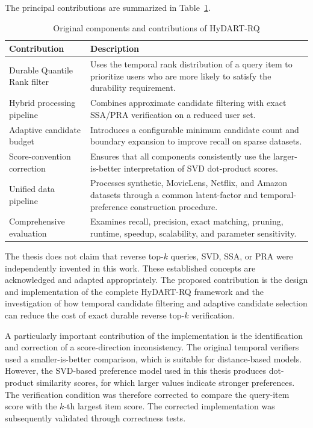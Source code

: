 The principal contributions are summarized in Table~\ref{tab:original_contributions}.

\begin{table}[htbp]
\centering
\caption{Original components and contributions of HyDART-RQ}
\label{tab:original_contributions}
\small
\renewcommand{\arraystretch}{1.25}
\setlength{\tabcolsep}{4pt}
\begin{tabularx}{\textwidth}{|p{3.5cm}|X|}
\hline
\textbf{Contribution} &
\textbf{Description} \\
\hline
Durable Quantile Rank filter &
Uses the temporal rank distribution of a query item to prioritize users who are more likely to satisfy the durability requirement. \\
\hline
Hybrid processing pipeline &
Combines approximate candidate filtering with exact SSA/PRA verification on a reduced user set. \\
\hline
Adaptive candidate budget &
Introduces a configurable minimum candidate count and boundary expansion to improve recall on sparse datasets. \\
\hline
Score-convention correction &
Ensures that all components consistently use the larger-is-better interpretation of SVD dot-product scores. \\
\hline
Unified data pipeline &
Processes synthetic, MovieLens, Netflix, and Amazon datasets through a common latent-factor and temporal-preference construction procedure. \\
\hline
Comprehensive evaluation &
Examines recall, precision, exact matching, pruning, runtime, speedup, scalability, and parameter sensitivity. \\
\hline
\end{tabularx}
\end{table}

The thesis does not claim that reverse top-$k$ queries, SVD, SSA, or PRA were independently invented in this work. These established concepts are acknowledged and adapted appropriately. The proposed contribution is the design and implementation of the complete HyDART-RQ framework and the investigation of how temporal candidate filtering and adaptive candidate selection can reduce the cost of exact durable reverse top-$k$ verification.

A particularly important contribution of the implementation is the identification and correction of a score-direction inconsistency. The original temporal verifiers used a smaller-is-better comparison, which is suitable for distance-based models. However, the SVD-based preference model used in this thesis produces dot-product similarity scores, for which larger values indicate stronger preferences. The verification condition was therefore corrected to compare the query-item score with the $k$-th largest item score. The corrected implementation was subsequently validated through correctness tests.


